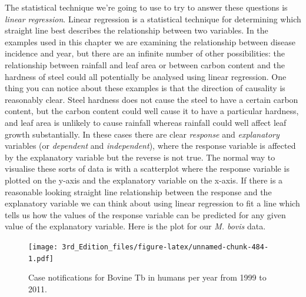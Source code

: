 \documentclass[
]{book}
\newenvironment{Shaded}{\begin{snugshade}}{\end{snugshade}}
\newcommand{\CommentTok}[1]{\textcolor[rgb]{0.56,0.35,0.01}{\textit{#1}}}
\newcommand{\DataTypeTok}[1]{\textcolor[rgb]{0.13,0.29,0.53}{#1}}
\newcommand{\DecValTok}[1]{\textcolor[rgb]{0.00,0.00,0.81}{#1}}
\newcommand{\KeywordTok}[1]{\textcolor[rgb]{0.13,0.29,0.53}{\textbf{#1}}}
\newcommand{\NormalTok}[1]{#1}
\newcommand{\OperatorTok}[1]{\textcolor[rgb]{0.81,0.36,0.00}{\textbf{#1}}}
\newcommand{\OtherTok}[1]{\textcolor[rgb]{0.56,0.35,0.01}{#1}}
\newcommand{\StringTok}[1]{\textcolor[rgb]{0.31,0.60,0.02}{#1}}
\begin{document}
The statistical technique we're going to use to try to answer these questions is \emph{linear regression}. Linear regression is a statistical technique for determining which straight line best describes the relationship between two variables. In the examples used in this chapter we are examining the relationship between disease incidence and year, but there are an infinite number of other possibilities: the relationship between rainfall and leaf area or between carbon content and the hardness of steel could all potentially be analysed using linear regression. One thing you can notice about these examples is that the direction of causality is reasonably clear. Steel hardness does not cause the steel to have a certain carbon content, but the carbon content could well cause it to have a particular hardness, and leaf area is unlikely to cause rainfall whereas rainfall could well affect leaf growth substantially. In these cases there are clear \emph{response} and \emph{explanatory} variables (or \emph{dependent} and \emph{independent}), where the response variable is affected by the explanatory variable but the reverse is not true. The normal way to visualise these sorts of data is with a scatterplot where the response variable is plotted on the y-axis and the explanatory variable on the x-axis. If there is a reasonable looking straight line relationship between the response and the explanatory variable we can think about using linear regression to fit a line which tells us how the values of the response variable can be predicted for any given value of the explanatory variable. Here is the plot for our \emph{M. bovis} data.

\begin{Shaded}
\end{Shaded}

\begin{figure}
\centering
\texttt{[image: 3rd\_Edition\_files/figure-latex/unnamed-chunk-484-1.pdf]}
\caption{\label{fig:unnamed-chunk-484}Case notifications for Bovine Tb in humans per year from 1999 to 2011.}
\end{figure}
\end{document}
